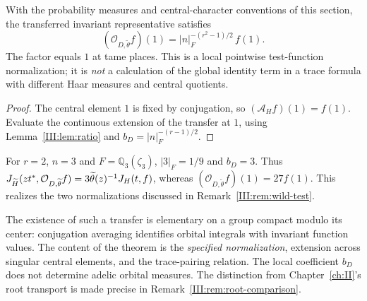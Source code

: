\begin{corollary}\label{III:cor:identity-factor}
With the probability measures and central-character conventions of this
section, the transferred invariant representative satisfies
\begin{equation}\label{III:eq:identity-factor}
\boxed{\quad(\mathcal O_{D,\widetilde\theta}f)(1)
=|n|_F^{-(r^2-1)/2}\,f(1).\quad}
\end{equation}
The factor equals $1$ at tame places. This is a local pointwise test-function
normalization; it is \emph{not} a calculation of the global identity term
in a trace formula with different Haar measures and central quotients.
\end{corollary}
\begin{proof}
The central element $1$ is fixed by conjugation, so
$(\mathcal A_Hf)(1)=f(1)$. Evaluate the continuous extension of the
transfer at $1$, using Lemma~\ref{III:lem:ratio} and
$b_D=|n|_F^{-(r-1)/2}$.
\end{proof}

\begin{remark}
For $r=2$, $n=3$ and $F=\mathbb Q_3(\zeta_3)$,
$|3|_F=1/9$ and $b_D=3$. Thus
$J_{\widetilde H}(z t^*,\mathcal O_{D,\widetilde\theta}f)=3\widetilde\theta(z)^{-1}J_H(t,f)$,
whereas $(\mathcal O_{D,\widetilde\theta}f)(1)=27f(1)$. This realizes the two
normalizations discussed in Remark~\ref{III:rem:wild-test}.
\end{remark}

\begin{remark}\label{III:rem:OI-scope}
The existence of such a transfer is elementary on a group compact
modulo its center: conjugation averaging identifies orbital integrals
with invariant function values. The content of the theorem is the
\emph{specified normalization}, extension across singular central
elements, and the trace-pairing relation. The local coefficient
$b_D$ does not determine adelic orbital measures. The distinction from Chapter~\ref{ch:II}'s root transport is made precise in Remark~\ref{III:rem:root-comparison}.
\end{remark}


